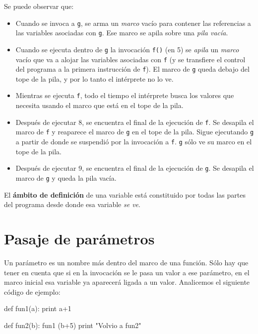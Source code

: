 Se puede observar que:
\begin{itemize}

\item Cuando se invoca a \lstinline|g|, se arma un {\it marco} vacío para
contener las referencias a las variables asociadas con \lstinline|g|. Ese
marco se apila sobre una {\it pila vacía}.

\item Cuando se ejecuta dentro de \lstinline|g| la invocación
\lstinline|f()| (en 5) se {\it apila} un {\it marco} vacío que va a alojar
las variables asociadas con \lstinline|f| (y se transfiere el control del
programa a la primera instrucción de \lstinline|f|).  El marco de
\lstinline|g| queda debajo del tope de la pila, y por lo tanto el
intérprete no lo ve.

\item Mientras se ejecuta \lstinline|f|, todo el tiempo el intérprete busca los
valores que necesita usando el marco que está en el tope de la pila.

\item Después de ejecutar 8, se encuentra el final de la ejecución de
\lstinline|f|.  Se desapila el marco de \lstinline|f| y reaparece el marco
de \lstinline|g| en el tope de la pila. Sigue ejecutando \lstinline|g| a
partir de donde se suspendió por la invocación a \lstinline|f|.
\lstinline|g| sólo ve su marco en el tope de la pila.

\item Después de ejecutar 9, se encuentra el final de la ejecución de
\lstinline|g|.  Se desapila el marco de \lstinline|g| y queda la pila vacía.

\end{itemize}

El {\bf ámbito de definición} de una variable está constituido por todas las
partes del programa desde donde esa variable {\it se ve}.

\section{Pasaje de parámetros}

Un parámetro es un nombre más dentro del marco de una función.
Sólo hay que tener en cuenta que si en la invocación se le pasa
un valor a ese parámetro, en el marco inicial esa variable ya aparecerá
ligada a un valor. Analicemos el siguiente código de ejemplo:

\begin{codigo-python-sn}
def fun1(a):
    print a+1

def fun2(b):
    fun1 (b+5)
    print "Volvio a fun2"
\end{codigo-python-sn}

